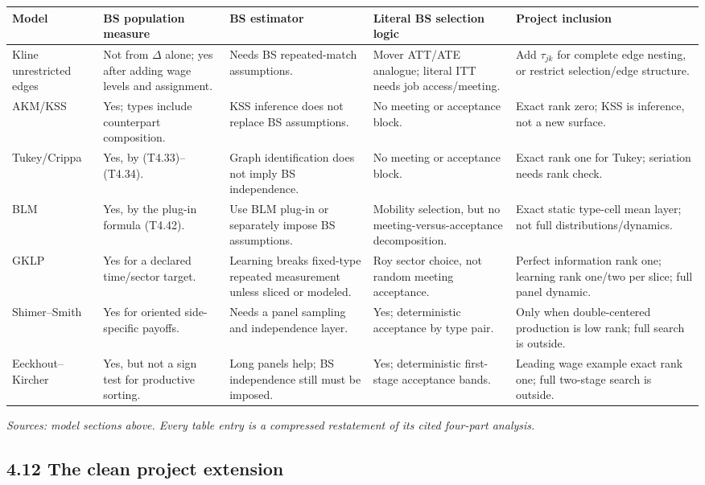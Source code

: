 \documentclass[11pt]{article}
\begin{document}
\begin{longtable}{p{}p{}p{}p{}p{}}
\textbf{Model} & \textbf{BS population measure} &
\textbf{BS estimator} & \textbf{Literal BS selection logic} &
\textbf{Project inclusion} \\
\hline
Kline unrestricted edges &
Not from \(\Delta\) alone; yes after adding wage levels and assignment. &
Needs BS repeated-match assumptions. &
Mover ATT/ATE analogue; literal ITT needs job access/meeting. &
Add \(\tau_{jk}\) for complete edge nesting, or restrict selection/edge
structure. \\
AKM/KSS &
Yes; types include counterpart composition. &
KSS inference does not replace BS assumptions. &
No meeting or acceptance block. &
Exact rank zero; KSS is inference, not a new surface. \\
Tukey/Crippa &
Yes, by (T4.33)--(T4.34). &
Graph identification does not imply BS independence. &
No meeting or acceptance block. &
Exact rank one for Tukey; seriation needs rank check. \\
BLM &
Yes, by the plug-in formula (T4.42). &
Use BLM plug-in or separately impose BS assumptions. &
Mobility selection, but no meeting-versus-acceptance decomposition. &
Exact static type-cell mean layer; not full distributions/dynamics. \\
GKLP &
Yes for a declared time/sector target. &
Learning breaks fixed-type repeated measurement unless sliced or modeled. &
Roy sector choice, not random meeting acceptance. &
Perfect information rank one; learning rank one/two per slice; full panel
dynamic. \\
Shimer--Smith &
Yes for oriented side-specific payoffs. &
Needs a panel sampling and independence layer. &
Yes; deterministic acceptance by type pair. &
Only when double-centered production is low rank; full search is outside. \\
Eeckhout--Kircher &
Yes, but not a sign test for productive sorting. &
Long panels help; BS independence still must be imposed. &
Yes; deterministic first-stage acceptance bands. &
Leading wage example exact rank one; full two-stage search is outside. \\
\end{longtable}

\textit{Sources: model sections above.  Every table entry is a compressed
restatement of its cited four-part analysis.}

\subsection{4.12 The clean project extension}
\end{document}
